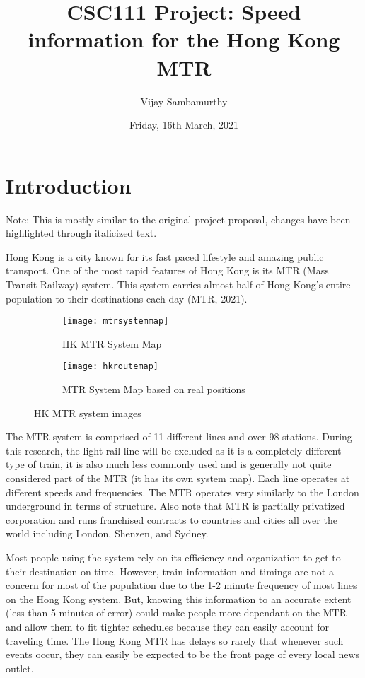 \documentclass[fontsize=11pt]{article}
\title{CSC111 Project: Speed information for the Hong Kong MTR}
\author{Vijay Sambamurthy}
\date{Friday, 16th March, 2021}
\begin{document}
\maketitle

\section*{Introduction}
Note: This is mostly similar to the original project proposal, changes have been highlighted through italicized text.

Hong Kong is a city known for its fast paced lifestyle and amazing public transport. One of the most rapid features of Hong Kong is its MTR (Mass Transit Railway) system. This system carries almost half of Hong Kong's entire population to their destinations each day (MTR, 2021). 

\begin{figure}[h]

\begin{subfigure}{0.5\textwidth}
\texttt{[image: mtrsystemmap]} 
\caption{HK MTR System Map}
\label{fig:subim1}
\end{subfigure}
\begin{subfigure}{0.5\textwidth}
\texttt{[image: hkroutemap]}
\caption{MTR System Map based on real positions}
\label{fig:subim2}
\end{subfigure}

\caption{HK MTR system images}
\label{fig:image2}
\end{figure}

The MTR system is comprised of 11 different lines and over 98 stations. During this research, the light rail line will be excluded as it is a completely different type of train, it is also much less commonly used and is generally not quite considered part of the MTR (it has its own system map). Each line operates at different speeds and frequencies. The MTR operates very similarly to the London underground in terms of structure. Also note that MTR is partially privatized corporation and runs franchised contracts to countries and cities all over the world including London, Shenzen, and Sydney.

Most people using the system rely on its efficiency and organization to get to their destination on time. However, train information and timings are not a concern for most of the population due to the 1-2 minute frequency of most lines on the Hong Kong system. But, knowing this information to an accurate extent (less than 5 minutes of error) could make people more dependant on the MTR and allow them to fit tighter schedules because they can easily account for traveling time. The Hong Kong MTR has delays so rarely that whenever such events occur, they can easily be expected to be the front page of every local news outlet. 
\end{document}
